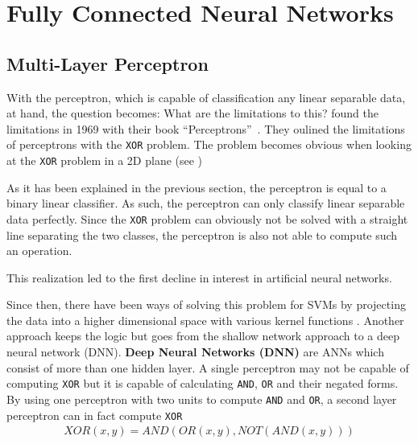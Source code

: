 \section{Fully Connected Neural Networks}
\subsection{Multi-Layer Perceptron}
With the perceptron, which is capable of classification any linear separable data, at hand, the question becomes: What are the limitations to this?
\citeauthor{perceptrons} found the limitations in 1969 with their book ``Perceptrons''~\cite{perceptrons}.
They oulined the limitations of perceptrons with the \lstinline|XOR| problem.
The problem becomes obvious when looking at the \lstinline|XOR| problem in a 2D plane (see )
\begin{marginfigure}
    \resizebox{\textwidth}{!}{
        
    }
    \caption{\lstinline|OR| and \lstinline|XOR| operations visualized. The \lstinline|XOR| problem cannot be solved by drawing a single line.}
\end{marginfigure}

As it has been explained in the previous section, the perceptron is equal to a binary linear classifier.
As such, the perceptron can only classify linear separable data perfectly.
Since the \lstinline|XOR| problem can obviously not be solved with a straight line separating the two classes, the perceptron is also not able to compute such an operation. 

This realization led to the first decline in interest in artificial neural networks.

Since then, there have been ways of solving this problem for SVMs by projecting the data into a higher dimensional space with various kernel functions \cite{ommer}.
Another approach keeps the logic but goes from the shallow network approach to a deep neural network (DNN).
\textbf{Deep Neural Networks (DNN)} are ANNs which consist of more than one hidden layer.
A single perceptron may not be capable of computing \lstinline|XOR| but it is capable of calculating \lstinline|AND|, \lstinline|OR| and their negated forms.
By using one perceptron with two units to compute \lstinline|AND| and \lstinline|OR|, a second layer perceptron can in fact compute \lstinline|XOR|
\begin{align}
    XOR(x, y) = AND(OR(x, y), NOT(AND(x, y)))
\end{align}

